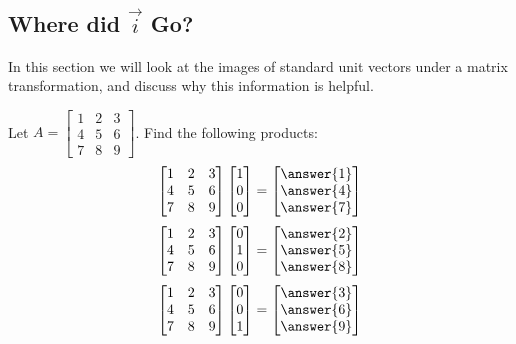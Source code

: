\documentclass{ximera}
\begin{document}
\subsection*{Where did $\vec{i}$ Go?}
In this section we will look at the images of standard unit vectors under a matrix transformation, and discuss why this information is helpful.
\begin{exploration}\label{exp:imagesOfijk}
    Let $A=\begin{bmatrix}1&2&3\\4&5&6\\7&8&9\end{bmatrix}$.
    Find the following products:
$$\begin{bmatrix}1&2&3\\4&5&6\\7&8&9\end{bmatrix}\begin{bmatrix}1\\0\\0\end{bmatrix}=\begin{bmatrix}\answer{1}\\\answer{4}\\\answer{7}\end{bmatrix}$$
$$\begin{bmatrix}1&2&3\\4&5&6\\7&8&9\end{bmatrix}\begin{bmatrix}0\\1\\0\end{bmatrix}=\begin{bmatrix}\answer{2}\\\answer{5}\\\answer{8}\end{bmatrix}$$
$$\begin{bmatrix}1&2&3\\4&5&6\\7&8&9\end{bmatrix}\begin{bmatrix}0\\0\\1\end{bmatrix}=\begin{bmatrix}\answer{3}\\\answer{6}\\\answer{9}\end{bmatrix}$$


\end{exploration}
\end{document}
